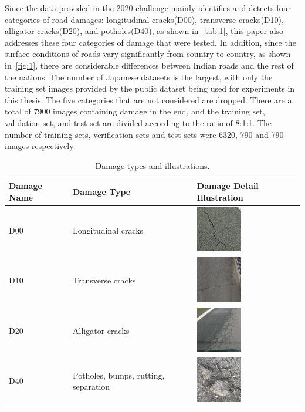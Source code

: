 \documentclass[sensors,article,submit,moreauthors]{Definitions/mdpi}
\begin{document}
    Since the data provided in the 2020 challenge mainly identifies and detects four categories of road damages: longitudinal cracks(D00), transverse cracks(D10), alligator cracks(D20), and potholes(D40), as shown in~\autoref{tab:1}, this paper also addresses these four categories of damage that were tested. In addition, since the surface conditions of roads vary significantly from country to country, as shown in~\autoref{fig:1}, there are considerable differences between Indian roads and the rest of the nations. The number of Japanese datasets is the largest, with only the training set images provided by the public dataset being used for experiments in this thesis. The five categories that are not considered are dropped. There are a total of 7900 images containing damage in the end, and the training set, validation set, and test set are divided according to the ratio of 8:1:1. The number of training sets, verification sets and test sets were 6320, 790 and 790 images respectively.

    \begin{table}[H]
        \caption{Damage types and illustrations.\label{tab:1}}
        \begin{tabularx}{\textwidth}{>{\centering\arraybackslash}m{4cm}>{\centering\arraybackslash}m{4cm}>{\centering\arraybackslash}m{5cm}}
            \toprule
            \textbf{Damage Name} & \textbf{Damage Type}                 & \textbf{Damage Detail Illustration}          \\
            \midrule
            D00                  & Longitudinal cracks                  & \includegraphics[width=2cm]{images/table1-1} \\
            D10                  & Transverse cracks                    & \includegraphics[width=2cm]{images/table1-2} \\
            D20                  & Alligator cracks                     & \includegraphics[width=2cm]{images/table1-3} \\
            D40                  & Potholes, bumps, rutting, separation & \includegraphics[width=2cm]{images/table1-4} \\
            \bottomrule
        \end{tabularx}
    \end{table}
\end{document}
